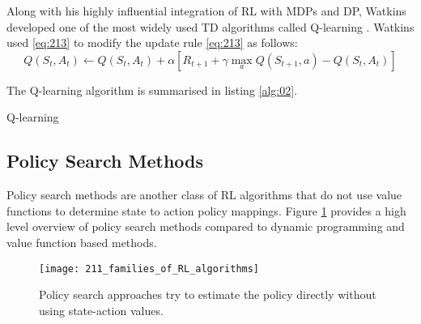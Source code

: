 Along with his highly influential integration of RL with MDPs and DP, Watkins developed one of the most widely used TD algorithms called Q-learning \cite{Watkins1989}. Watkins used \ref{eq:213} to modify the update rule \ref{eq:213} as follows:
\begin{equation}
	Q(S_t, A_t) \gets Q(S_t, A_t) + \alpha[R_{t+1} + \gamma \max_{a} Q(S_{t+1},a) - Q(S_t, A_t)] \label{eq:214}
\end{equation}

The Q-learning algorithm is summarised in listing \ref{alg:02}.

\begin{algorithm}[h]
	\caption{Q-learning}
	\label{alg:02_q_learning}
	\begin{algorithmic}[1]
			\Repeat
		\EndFor
	\end{algorithmic} \label{alg:02}
\end{algorithm}


\subsection{Policy Search Methods}
Policy search methods are another class of RL algorithms that do not use value functions to determine state to action policy mappings. Figure \ref{fig:2xx_families_of_RL_algorithms} provides a high level overview of policy search methods compared to dynamic programming and value function based methods.

\begin{figure}[h]
	\centering
	\texttt{[image: 211\_families\_of\_RL\_algorithms]}
	\caption[RL approaches: Policy search]{Policy search approaches try to estimate the policy directly without using state-action values.}
	\label{fig:2xx_families_of_RL_algorithms}
\end{figure}

